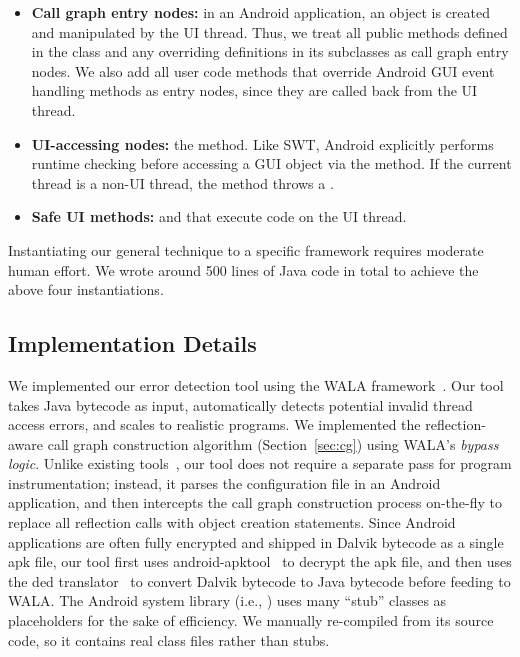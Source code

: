 \begin{myindentpar}{-2mm}
\begin{itemize}
\tinystep

\item \textbf{Call graph entry nodes: }in an Android application,
an  object is created and manipulated by the UI thread. Thus, we treat
all public methods defined in the  class 
and any overriding definitions in its subclasses as call graph entry nodes.
We also add all user code methods that override Android GUI event handling methods
as entry nodes, since they are called back from the UI thread.

\tinystep

\item \textbf{UI-accessing nodes: }the  method.
Like SWT, Android explicitly performs runtime checking before accessing
a GUI object via the  method. If the current
thread is a non-UI thread, the  method throws
a .

\tinystep

\item \textbf{Safe UI methods: } 
and  that execute code on the UI thread. 

\end{itemize}
\end{myindentpar}

\tinystep

Instantiating our general technique to  a specific framework
requires moderate human effort. We wrote around 500 lines of Java code in total to achieve
the above four instantiations.

\subsection{Implementation Details}

We implemented our error detection tool using
the WALA framework~\cite{walatutorial}.
Our tool takes Java bytecode as input, 
automatically detects potential invalid thread access
errors, and scales to realistic programs.  
We implemented the reflection-aware call graph construction
 algorithm (Section~\ref{sec:cg}) using WALA's \textit{bypass logic}.
Unlike existing tools~\cite{Payet:2011:SAA:2032266.2032299}, our tool
does not require a separate pass for program instrumentation; instead, it
parses the configuration file in an Android application,
and then intercepts the call graph construction
process on-the-fly to replace all reflection calls with object creation statements.
Since Android applications are often fully encrypted and shipped in Dalvik
bytecode as a single apk file, our tool first uses
android-apktool~\cite{apktool} to
decrypt the apk file, and then uses the 
ded translator~\cite{ded} to convert
Dalvik bytecode to Java bytecode before feeding to WALA.  The Android system
library (i.e., ) uses many ``stub'' classes as
placeholders for the sake of efficiency. We manually re-compiled 
 from its source code, so it contains real
class files rather than stubs.
